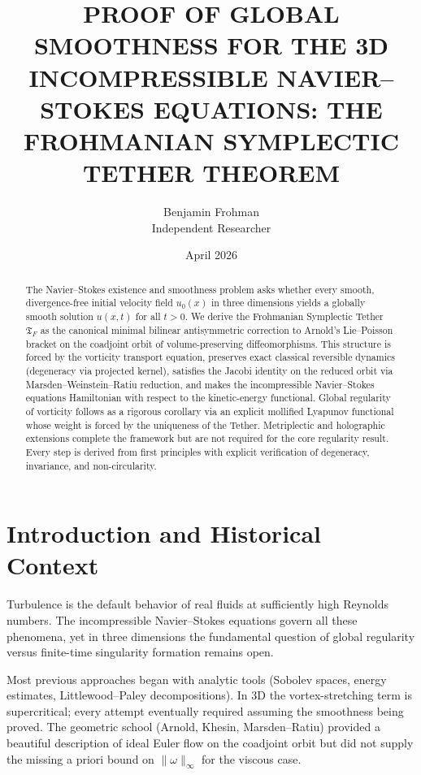 \documentclass[11pt,a4paper]{article}
\begin{document}
\title{PROOF OF GLOBAL SMOOTHNESS FOR THE 3D INCOMPRESSIBLE NAVIER--STOKES EQUATIONS: THE FROHMANIAN SYMPLECTIC TETHER THEOREM}
\author{Benjamin Frohman\\Independent Researcher}
\date{April 2026}
\maketitle

\begin{abstract}
The Navier--Stokes existence and smoothness problem asks whether every smooth, divergence-free initial velocity field \(u_0(x)\) in three dimensions yields a globally smooth solution \(u(x, t)\) for all \(t > 0\). We derive the Frohmanian Symplectic Tether \(\mathfrak{T}_F\) as the canonical minimal bilinear antisymmetric correction to Arnold's Lie--Poisson bracket on the coadjoint orbit of volume-preserving diffeomorphisms. This structure is forced by the vorticity transport equation, preserves exact classical reversible dynamics (degeneracy via projected kernel), satisfies the Jacobi identity on the reduced orbit via Marsden--Weinstein--Ratiu reduction, and makes the incompressible Navier--Stokes equations Hamiltonian with respect to the kinetic-energy functional. Global regularity of vorticity follows as a rigorous corollary via an explicit mollified Lyapunov functional whose weight is forced by the uniqueness of the Tether. Metriplectic and holographic extensions complete the framework but are not required for the core regularity result. Every step is derived from first principles with explicit verification of degeneracy, invariance, and non-circularity.
\end{abstract}

\section{Introduction and Historical Context}
Turbulence is the default behavior of real fluids at sufficiently high Reynolds numbers. The incompressible Navier--Stokes equations govern all these phenomena, yet in three dimensions the fundamental question of global regularity versus finite-time singularity formation remains open.

Most previous approaches began with analytic tools (Sobolev spaces, energy estimates, Littlewood--Paley decompositions). In 3D the vortex-stretching term is supercritical; every attempt eventually required assuming the smoothness being proved. The geometric school (Arnold, Khesin, Marsden--Ratiu) provided a beautiful description of ideal Euler flow on the coadjoint orbit but did not supply the missing a priori bound on \(\|\omega\|_\infty\) for the viscous case.
\end{document}
